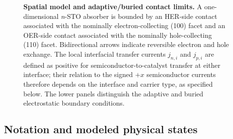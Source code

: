 \documentclass[11pt]{article}
\begin{document}
\begin{figure}[p]
{%
}
\caption{\textbf{Spatial model and adaptive/buried contact limits.} A one-dimensional \emph{n}-STO absorber is bounded by an HER-side contact associated with the nominally electron-collecting (100) facet and an OER-side contact associated with the nominally hole-collecting (110) facet. Bidirectional arrows indicate reversible electron and hole exchange. The local interfacial transfer currents $j_{n,i}$ and $j_{p,i}$ are defined as positive for semiconductor-to-catalyst transfer at either interface; their relation to the signed $+x$ semiconductor currents therefore depends on the interface and carrier type, as specified below. The lower panels distinguish the adaptive and buried electrostatic boundary conditions.}

\label{fig:model-framework}
\end{figure}


\subsection{Notation and modeled physical states}
\end{document}
